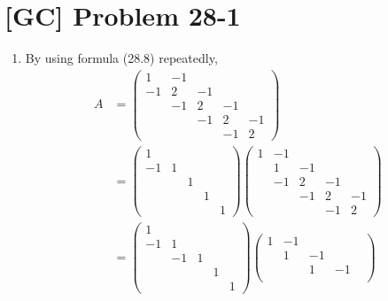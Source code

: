 \documentclass[a4paper,11pt]{article}
\begin{document}
  \section{[GC] Problem 28-1}
  \begin{enumerate}
    \item By using formula (28.8) repeatedly,
      \begin{align*}
        A &= \begin{pmatrix}
               1 & -1 &  &  &  \\
               -1 & 2 & -1 &  &  \\
                & -1 & 2 & -1 &  \\
                &  & -1 & 2 & -1 \\
                &  &  & -1 & 2
             \end{pmatrix} \\
          &= \begin{pmatrix}
               1 &  &  &  &  \\
               -1 & 1 &  &  &  \\
                &  & 1 &  &  \\
                &  &  & 1 &  \\
                &  &  &  & 1
             \end{pmatrix}
             \begin{pmatrix}
               1 & -1 &  &  &  \\
                & 1 & -1 &  &  \\
                & -1 & 2 & -1 &  \\
                &  & -1 & 2 & -1 \\
                &  &  & -1 & 2
             \end{pmatrix} \\
          &= \begin{pmatrix}
               1 &  &  &  &  \\
               -1 & 1 &  &  &  \\
                & -1 & 1 &  &  \\
                &  &  & 1 &  \\
                &  &  &  & 1
             \end{pmatrix}
             \begin{pmatrix}
               1 & -1 &  &  &  \\
                & 1 & -1 &  &  \\
                &  & 1 & -1 &  \\

\end{pmatrix}
\end{align*}
\end{enumerate}
\end{document}

